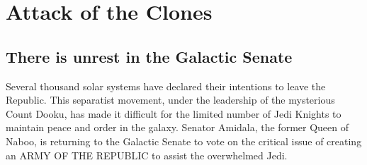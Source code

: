 \chapter{Attack of the Clones}	
\section{There is unrest in the Galactic Senate}
Several thousand solar systems have declared their intentions 
to leave the Republic. This separatist movement, under the 
leadership of the mysterious Count Dooku, has made it 
difficult for the limited number of Jedi Knights to maintain 
peace and order in the galaxy. Senator Amidala, the former 
Queen of Naboo, is returning to the Galactic Senate to vote 
on the critical issue of creating an ARMY OF THE REPUBLIC to 
assist the overwhelmed Jedi.
\lipsum[1-10]
\cite{BJORKEN_1983}

